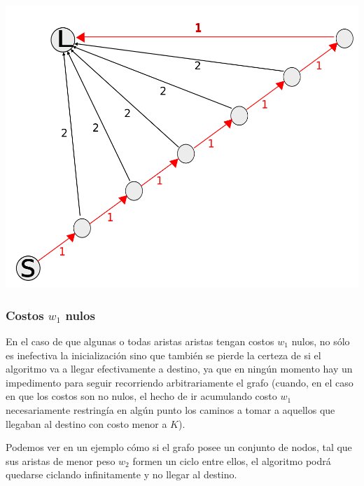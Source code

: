 \begin{center}
\includegraphics[scale=0.35]{img/grafoChoto.png}
\end{center}

\subsubsection{Costos $w_1$ nulos}

En el caso de que algunas o todas aristas aristas tengan costos $w_1$ nulos, no s\'olo es inefectiva la inicializaci\'on sino que tambi\'en se pierde la certeza de si el algoritmo va a llegar efectivamente a destino, ya que en ning\'un momento hay un impedimento para seguir recorriendo arbitrariamente el grafo (cuando, en el caso en que los costos son no nulos, el hecho de ir acumulando costo $w_1$ necesariamente restring\'ia en alg\'un punto los caminos a tomar a aquellos que llegaban al destino con costo menor a $K$).

\vspace{2mm}

Podemos ver en un ejemplo c\'omo si el grafo posee un conjunto de nodos, tal que sus aristas de menor peso $w_2$ formen un ciclo entre ellos, el algoritmo podr\'a quedarse ciclando infinitamente y no llegar al destino.

